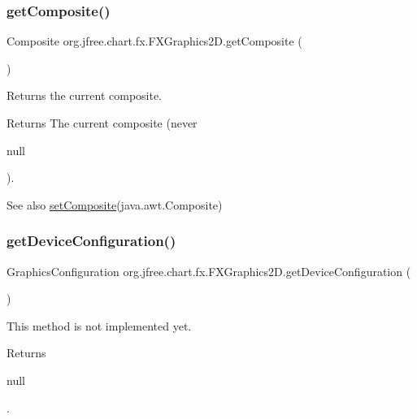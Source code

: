 \subsubsection{\texorpdfstring{get\+Composite()}{getComposite()}}
{\footnotesize\ttfamily Composite org.\+jfree.\+chart.\+fx.\+F\+X\+Graphics2\+D.\+get\+Composite (\begin{DoxyParamCaption}{ }\end{DoxyParamCaption})}

Returns the current composite.

\begin{DoxyReturn}{Returns}
The current composite (never
\begin{DoxyCode}
null 
\end{DoxyCode}
 ).
\end{DoxyReturn}
\begin{DoxySeeAlso}{See also}
\mbox{\hyperlink{classorg_1_1jfree_1_1chart_1_1fx_1_1_f_x_graphics2_d_acaccf830e2e26b3558ede1c13933365c}{set\+Composite}}(java.\+awt.\+Composite) 
\end{DoxySeeAlso}
\mbox{\label{classorg_1_1jfree_1_1chart_1_1fx_1_1_f_x_graphics2_d_a086eed2be1115ccaca80e0797d381a5d}} 
\subsubsection{\texorpdfstring{get\+Device\+Configuration()}{getDeviceConfiguration()}}
{\footnotesize\ttfamily Graphics\+Configuration org.\+jfree.\+chart.\+fx.\+F\+X\+Graphics2\+D.\+get\+Device\+Configuration (\begin{DoxyParamCaption}{ }\end{DoxyParamCaption})}

This method is not implemented yet. \begin{DoxyReturn}{Returns}

\begin{DoxyCode}
null 
\end{DoxyCode}
 . 
\end{DoxyReturn}
\mbox{\label{classorg_1_1jfree_1_1chart_1_1fx_1_1_f_x_graphics2_d_ab188424f822b24ccc86d39740e4183e4}} 
